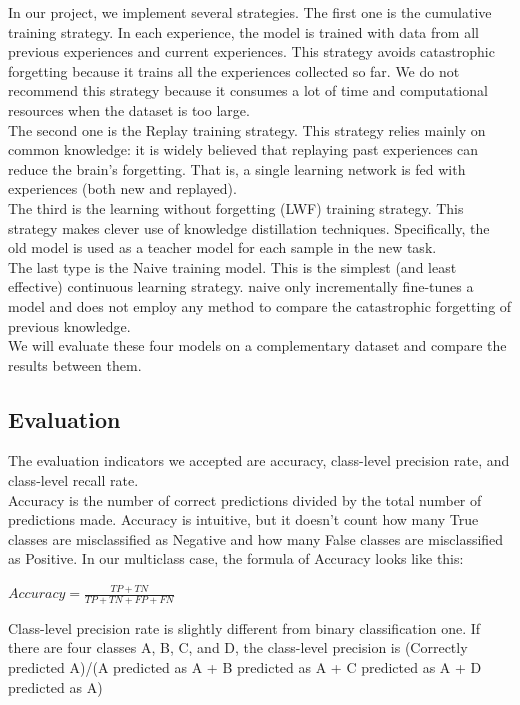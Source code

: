 \documentclass[lang=english,inputenc=utf8,fontsize=10pt]{ldvarticle}
\begin{document}
In our project, we implement several strategies. The first one is the cumulative training strategy. In each experience, the model is trained with data from all previous experiences and current experiences. This strategy avoids catastrophic forgetting because it trains all the experiences collected so far. We do not recommend this strategy because it consumes a lot of time and computational resources when the dataset is too large.\\

The second one is the Replay training strategy. This strategy relies mainly on common knowledge: it is widely believed that replaying past experiences can reduce the brain's forgetting. That is, a single learning network is fed with experiences (both new and replayed).\\

The third is the learning without forgetting (LWF) training strategy. This strategy makes clever use of knowledge distillation techniques. Specifically, the old model is used as a teacher model for each sample in the new task.\\

The last type is the Naive training model. This is the simplest (and least effective) continuous learning strategy. naive only incrementally fine-tunes a model and does not employ any method to compare the catastrophic forgetting of previous knowledge.\\

We will evaluate these four models on a complementary dataset and compare the results between them.\\


\subsection{Evaluation}
The evaluation indicators we accepted are accuracy, class-level precision rate, and class-level recall rate.\\

Accuracy is the number of correct predictions divided by the total number of predictions made. Accuracy is intuitive, but it doesn’t count how many True classes are misclassified as Negative and how many False classes are misclassified as Positive. In our multiclass case, the formula of Accuracy looks like this:

\begin{center}
    $Accuracy=\frac{TP+TN}{TP+TN+FP+FN}$
\end{center}
Class-level precision rate is slightly different from binary classification one. If there are four classes A, B, C, and D, the class-level precision is (Correctly predicted A)/(A predicted as A + B predicted as A + C predicted as A + D predicted as A)\\
\end{document}
